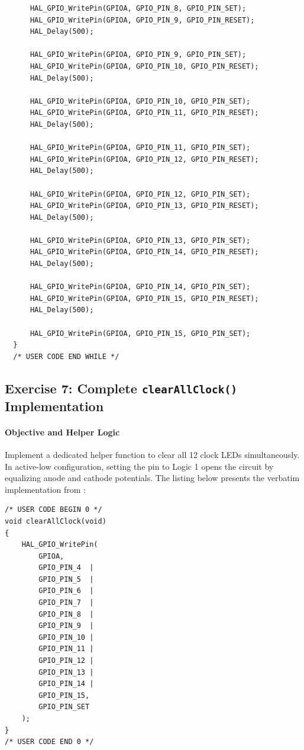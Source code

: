\documentclass[oneside,final]{hcmut-report}
\begin{document}
\begin{lstlisting}
      HAL_GPIO_WritePin(GPIOA, GPIO_PIN_8, GPIO_PIN_SET);
      HAL_GPIO_WritePin(GPIOA, GPIO_PIN_9, GPIO_PIN_RESET);
      HAL_Delay(500);

      HAL_GPIO_WritePin(GPIOA, GPIO_PIN_9, GPIO_PIN_SET);
      HAL_GPIO_WritePin(GPIOA, GPIO_PIN_10, GPIO_PIN_RESET);
      HAL_Delay(500);

      HAL_GPIO_WritePin(GPIOA, GPIO_PIN_10, GPIO_PIN_SET);
      HAL_GPIO_WritePin(GPIOA, GPIO_PIN_11, GPIO_PIN_RESET);
      HAL_Delay(500);

      HAL_GPIO_WritePin(GPIOA, GPIO_PIN_11, GPIO_PIN_SET);
      HAL_GPIO_WritePin(GPIOA, GPIO_PIN_12, GPIO_PIN_RESET);
      HAL_Delay(500);

      HAL_GPIO_WritePin(GPIOA, GPIO_PIN_12, GPIO_PIN_SET);
      HAL_GPIO_WritePin(GPIOA, GPIO_PIN_13, GPIO_PIN_RESET);
      HAL_Delay(500);

      HAL_GPIO_WritePin(GPIOA, GPIO_PIN_13, GPIO_PIN_SET);
      HAL_GPIO_WritePin(GPIOA, GPIO_PIN_14, GPIO_PIN_RESET);
      HAL_Delay(500);

      HAL_GPIO_WritePin(GPIOA, GPIO_PIN_14, GPIO_PIN_SET);
      HAL_GPIO_WritePin(GPIOA, GPIO_PIN_15, GPIO_PIN_RESET);
      HAL_Delay(500);

      HAL_GPIO_WritePin(GPIOA, GPIO_PIN_15, GPIO_PIN_SET);
  }
  /* USER CODE END WHILE */
\end{lstlisting}
\subsection{Exercise 7: Complete \texttt{clearAllClock()} Implementation}
\label{subsec:ex7}
\paragraph{Objective and Helper Logic}
Implement a dedicated helper function to clear all 12 clock LEDs simultaneously. In active-low configuration, setting the pin to Logic 1 opens the circuit by equalizing anode and cathode potentials. The listing below presents the verbatim implementation from :

\begin{lstlisting}[caption={[clearAllClock() function]{Complete clearAllClock() implementation (Lab1\_e7/Core/Src/main.c)}},label={lst:ex7_func},basicstyle=\fontsize{6.6pt}{7.3pt}\ttfamily,lineskip=0pt,aboveskip=0pt,belowskip=0pt]
/* USER CODE BEGIN 0 */
void clearAllClock(void)
{
    HAL_GPIO_WritePin(
        GPIOA,
        GPIO_PIN_4  |
        GPIO_PIN_5  |
        GPIO_PIN_6  |
        GPIO_PIN_7  |
        GPIO_PIN_8  |
        GPIO_PIN_9  |
        GPIO_PIN_10 |
        GPIO_PIN_11 |
        GPIO_PIN_12 |
        GPIO_PIN_13 |
        GPIO_PIN_14 |
        GPIO_PIN_15,
        GPIO_PIN_SET
    );
}
/* USER CODE END 0 */
\end{lstlisting}
\end{document}
